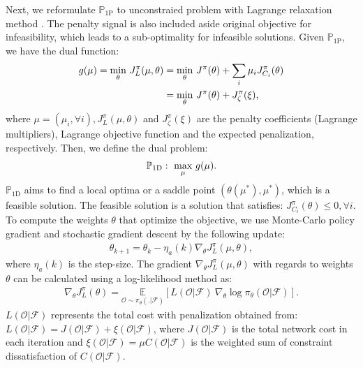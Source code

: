 Next, we reformulate $\mathbb{P}_{1\text{P}}$ to unconstraied problem with Lagrange relaxation method \cite{Bertsekas}. The penalty signal is also included aside  original objective for infeasibility, which leads to a sub-optimality for infeasible solutions. Given $\mathbb{P}_{\text{1P}}$, we have the dual function:
%
\begin{align} 
	\label{eq:dual_function}
	g({\mu}) = \underset{\theta }{\text{min}} \  J_L^\pi({\mu},\theta) &= \underset{\theta }{\text{min}} \  J^\pi(\theta) + \sum_{i} \mu_i J_{C_{i}}^\pi(\theta) \notag \\
	&=\underset{\theta }{\text{min}} \  J^\pi(\theta) + J_\zeta^\pi(\xi),
\end{align}
where $\mu \!=\! (\mu_i, \forall i), J_L^\pi({\mu},\theta)$ and $J_\zeta^\pi(\xi)$ are the  penalty coefficients (Lagrange multipliers), Lagrange objective function and the expected penalization, respectively. Then, we define the dual problem:
%
\begin{align}
\mathbb{P}_{1\text{D}}: \ \underset{{\mu} }{\text{max}} \  g({\mu}). \notag
\end{align}
%
%
$\mathbb{P}_{1\text{D}}$ aims to find a local optima or a saddle point $(\theta({\mu}^*), {\mu}^*)$, which is a feasible solution. The feasible solution is a solution that satisfies:  $J_{C_{i}}^\pi(\theta) \leq 0, \forall i$. 
%
% 
%
To compute the weights $\theta$ that optimize the objective, we use Monte-Carlo policy gradient and stochastic gradient descent by the following update:
\begin{align}\label{eq:update1}
	\theta_{k+1} = \theta_{k} - \eta_a(k) 	 \nabla_\theta J_L^\pi({\mu},\theta), 
\end{align}
%
where $\eta_a(k) $ is the step-size. The gradient $\nabla_\theta J_L^\pi({\mu},\theta)$  with regards to weights $\theta$ can be calculated using a log-likelihood method as:
%
%
\begin{align}
\nabla_\theta J_L^\pi(\theta) = \underset{\mathcal{O} \sim \pi_\theta(.|\mathcal{F}) }{\mathbb{E}} [ L(\mathcal{O}|\mathcal{F}) \ \nabla_\theta \log \pi_\theta(\mathcal{O}|\mathcal{F}) ].
\end{align} 
%
%
$L(\mathcal{O}|\mathcal{F})$ represents the total cost with penalization obtained from: 
	 $L(\mathcal{O}|\mathcal{F}) = J(\mathcal{O}|\mathcal{F}) + \xi (\mathcal{O}|\mathcal{F}) $, where
$J(\mathcal{O}|\mathcal{F})$ is the total network cost in each iteration and $\xi (\mathcal{O}|\mathcal{F}) = {\mu} C(\mathcal{O}|\mathcal{F})$ is the weighted sum of constraint dissatisfaction of $C(\mathcal{O}|\mathcal{F})$. 

